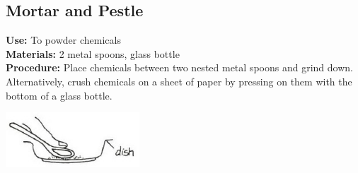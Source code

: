 \begin{multicols}{2}
%
%
%

\section{Mortar and Pestle}
\label{sec:mortar-and-pestle}
\vspace{-10pt}
\textbf{Use:} To powder chemicals\\
\textbf{Materials:} 2 metal spoons, glass bottle\\
\textbf{Procedure:} Place chemicals between two nested metal spoons and grind down. 
Alternatively, crush chemicals on a sheet of paper by pressing on them with the bottom of a glass bottle.
\begin{center}
\includegraphics[width=5cm]{./img/vso/mortar-pestle.jpg}
\end{center}


\end{multicols}
